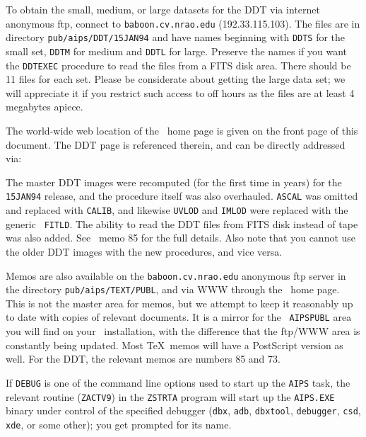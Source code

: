 To obtain the small, medium, or large datasets for the DDT via internet
anonymous ftp, connect to {\tt baboon.cv.nrao.edu} (192.33.115.103).
The files are in directory {\tt pub/aips/DDT/15JAN94} and have names
beginning with {\tt DDTS} for the small set, {\tt DDTM} for medium and
{\tt DDTL} for large.  Preserve the names if you want the {\tt DDTEXEC}
procedure to read the files from a FITS disk area.  There should be 11
files for each set.  Please be considerate about getting the large data
set; we will appreciate it if you restrict such access to off hours as
the files are at least 4 megabytes apiece.

The world-wide web location of the \AIPS\ home page is given on the front
page of this document.  The DDT page is referenced therein, and can be
directly addressed via:\medskip

\medskip

\noindent The master DDT images were recomputed (for the first time in
years) for the {\tt 15JAN94} release, and the procedure itself was also
overhauled.  {\tt ASCAL} was omitted and replaced with {\tt CALIB}, and
likewise {\tt UVLOD} and {\tt IMLOD} were replaced with the generic {\tt
FITLD}.  The ability to read the DDT files from FITS disk instead of tape
was also added.  See \AIPS\ memo 85 for the full details.  Also note that
you cannot use the older DDT images with the new procedures, and vice
versa.

Memos are also available on the {\tt baboon.cv.nrao.edu} anonymous ftp
server in the directory {\tt pub/aips/TEXT/PUBL}, and via WWW through the
\aips\ home page.  This is not the master area for memos, but we attempt
to keep it reasonably up to date with copies of relevant documents.  It is
a mirror for the {\tt
\dol AIPSPUBL} area you will find on your \AIPS\ installation, with the
difference that the ftp/WWW area is constantly being updated.  Most
\TeX\ memos will have a PostScript version as well.  For the DDT, the
relevant memos are numbers 85 and 73.

\medskip{}

If {\tt DEBUG} is one of the command line options used to start up the
{\tt AIPS} task, the relevant routine ({\tt ZACTV9}) in the {\tt ZSTRTA}
program will start up the {\tt AIPS.EXE} binary under control of the
specified debugger ({\tt dbx}, {\tt adb}, {\tt dbxtool}, {\tt debugger},
{\tt csd}, {\tt xde}, or some other); you get prompted for its name.


